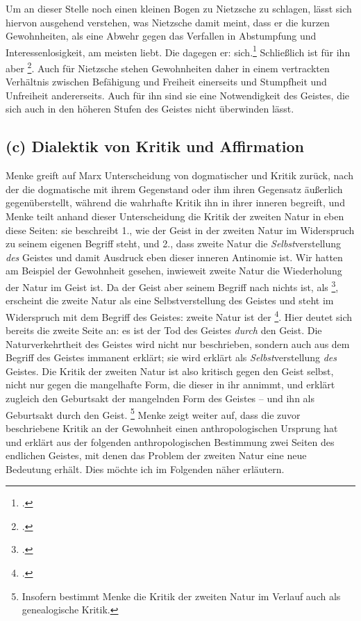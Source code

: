 \documentclass[12pt, a4paper, openany]{report}
\begin{document}
Um an dieser Stelle noch einen kleinen Bogen zu Nietzsche zu schlagen, lässt sich hiervon ausgehend verstehen, was Nietzsche damit meint, dass er die kurzen Gewohnheiten, als eine Abwehr gegen das Verfallen in Abstumpfung und Interessenlosigkeit, am meisten liebt.
Die  dagegen  er:  sich.\footcite[][535]{nietzsche_morgenrote_1999}
Schließlich ist für ihn  aber \footcite[][535]{nietzsche_morgenrote_1999}.
Auch für Nietzsche stehen Gewohnheiten daher in einem vertrackten Verhältnis zwischen Befähigung und Freiheit einerseits und Stumpfheit und Unfreiheit andererseits. 
Auch für ihn sind sie eine Notwendigkeit des Geistes, die sich auch in den höheren Stufen des Geistes nicht überwinden lässt. 

\subsection{(c) Dialektik von Kritik und Affirmation}\label{kritik_affirmation}
Menke greift auf Marx Unterscheidung von dogmatischer und  Kritik zurück, nach der die dogmatische mit ihrem Gegenstand  oder ihm ihren Gegensatz äußerlich gegenüberstellt, während die wahrhafte Kritik ihn in ihrer inneren  begreift, und Menke teilt anhand dieser Unterscheidung die Kritik der zweiten Natur in eben diese Seiten:
sie beschreibt 1., wie der Geist in der zweiten Natur im Widerspruch zu seinem eigenen Begriff steht, und 2., dass zweite Natur die \emph{Selbst}verstellung \emph{des} Geistes und damit Ausdruck eben dieser inneren Antinomie ist.
Wir hatten am Beispiel der Gewohnheit gesehen, inwieweit zweite Natur die Wiederholung der Natur im Geist ist. 
Da der Geist aber seinem Begriff nach nichts ist, als \footcite[][137]{menke_autonomie_2018}, erscheint die zweite Natur als eine Selbstverstellung des Geistes und steht im Widerspruch mit dem Begriff des Geistes:
zweite Natur ist der \footcite[][43]{menke_autonomie_2018}.
Hier deutet sich bereits die zweite Seite an:
es ist der Tod des Geistes \emph{durch} den Geist.
Die Naturverkehrtheit des Geistes wird nicht nur beschrieben, sondern auch aus dem Begriff des Geistes immanent erklärt;
sie wird erklärt als \emph{Selbst}verstellung \emph{des} Geistes. 
Die Kritik der zweiten Natur ist also kritisch gegen den Geist selbst, nicht nur gegen die mangelhafte Form, die dieser in ihr annimmt, und erklärt zugleich den Geburtsakt der mangelnden Form des Geistes -- und ihn als Geburtsakt durch den Geist.%
\footnote{
    Insofern bestimmt Menke die Kritik der zweiten Natur im Verlauf auch als genealogische Kritik.
}
Menke zeigt weiter auf, dass die zuvor beschriebene Kritik an der Gewohnheit einen anthropologischen Ursprung hat und erklärt aus der folgenden anthropologischen Bestimmung zwei Seiten des endlichen Geistes, mit denen das Problem der zweiten Natur eine neue Bedeutung erhält.
Dies möchte ich im Folgenden näher erläutern.\\
\end{document}
